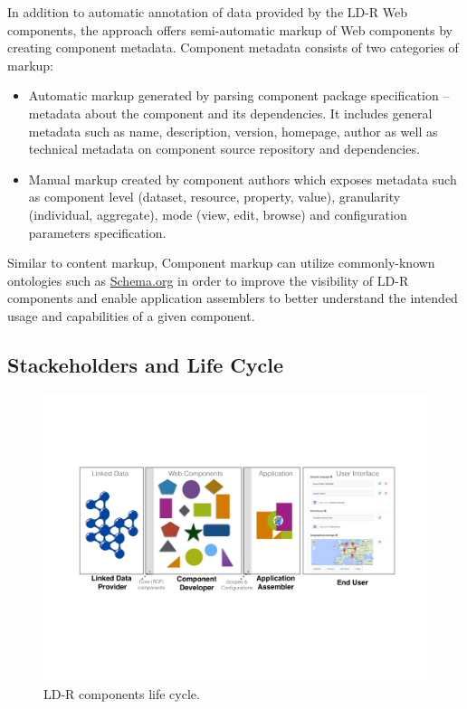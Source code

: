 \documentclass{acm_proc_article-sp}
\begin{document}
In addition to automatic annotation of data provided by the LD-R Web components, the approach offers semi-automatic markup of Web components by creating component metadata. 
Component metadata consists of two categories of markup:
\begin{itemize}
\item Automatic markup generated by parsing component package specification -- metadata about the component and its dependencies. It includes general metadata such as name, description, version, homepage, author as well as technical metadata on component source repository and dependencies.

\item Manual markup created by component authors which exposes metadata such as component level (dataset, resource, property, value), granularity (individual, aggregate), mode (view, edit, browse) and configuration parameters specification.

\end{itemize}

Similar to content markup, Component markup can utilize commonly-known ontologies such as \url{Schema.org} in order to improve the visibility of LD-R components and enable application assemblers to better understand the intended usage and capabilities of a given component.

\subsection{Stackeholders and Life Cycle}
\begin{figure}[tb]
  \includegraphics[width=1\linewidth]{images/lifecycle.pdf}
  \caption{LD-R components life cycle.}
  \label{fig:lifecycle}
\end{figure}
\end{document}
